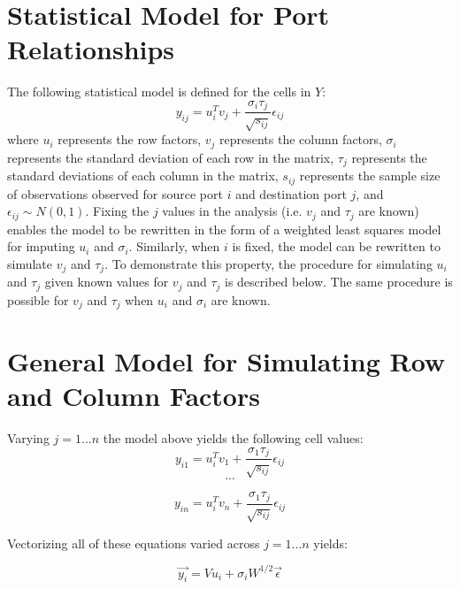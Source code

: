 \documentclass[12pt,twoside]{dukestatscithesis}
\theoremstyle{definition}
\theoremstyle{definition}
\theoremstyle{definition}
\theoremstyle{remark}
\begin{document}
\section{Statistical Model for Port
Relationships}\label{statistical-model-for-port-relationships}

The following statistical model is defined for the cells in \(Y\):
\[y_{ij} = u_i^Tv_j + \frac{\sigma_i \tau_j}{\sqrt{s_{ij}}}\epsilon_{ij}\]
where \(u_i\) represents the row factors, \(v_j\) represents the column
factors, \(\sigma_i\) represents the standard deviation of each row in
the matrix, \(\tau_j\) represents the standard deviations of each column
in the matrix, \(s_{ij}\) represents the sample size of observations
observed for source port \(i\) and destination port \(j\), and
\(\epsilon_{ij} \sim N(0,1)\). Fixing the \(j\) values in the analysis
(i.e. \(v_j\) and \(\tau_j\) are known) enables the model to be
rewritten in the form of a weighted least squares model for imputing
\(u_i\) and \(\sigma_i\). Similarly, when \(i\) is fixed, the model can
be rewritten to simulate \(v_j\) and \(\tau_j\). To demonstrate this
property, the procedure for simulating \(u_i\) and \(\tau_j\) given
known values for \(v_j\) and \(\tau_j\) is described below. The same
procedure is possible for \(v_j\) and \(\tau_j\) when \(u_i\) and
\(\sigma_i\) are known.

\section{General Model for Simulating Row and Column
Factors}\label{general-model-for-simulating-row-and-column-factors}

Varying \(j = 1 ... n\) the model above yields the following cell
values:
\[y_{i1} = u_i^Tv_1 + \frac{\sigma_1 \tau_j}{\sqrt{s_{ij}}}\epsilon_{ij}\]
\[ ... \]

\[ y_{in} = u_i^Tv_n + \frac{\sigma_1 \tau_j}{\sqrt{s_{ij}}}\epsilon_{ij} \]

Vectorizing all of these equations varied across \(j = 1...n\) yields:

\[\vec{y_i} = Vu_i + \sigma_i W^{1/2}\vec{\epsilon}\]
\end{document}
